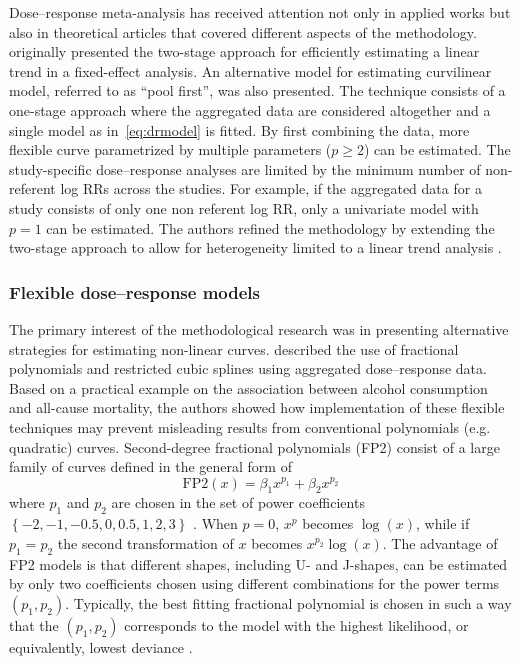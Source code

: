 \documentclass[11pt,a4paper,twoside,openany]{book}\usepackage{knitr}
\begin{document}
{Dose--response meta-analysis has received attention not only in applied works but also in theoretical articles that covered different aspects of the methodology. 
\noindent \cite{greenland1992methods} originally presented the two-stage approach for efficiently estimating a linear trend in a fixed-effect analysis. An alternative model for estimating curvilinear model, referred to as ``pool first'', was also presented. The technique consists of a one-stage approach where the aggregated data are considered altogether and a single model as in~\ref{eq:drmodel} is fitted. By first combining the data, more flexible curve parametrized by multiple parameters ($p \ge 2$) can be estimated. The study-specific dose--response analyses are limited by the minimum number of non-referent log RRs across the studies. For example, if the aggregated data for a study consists of only one non referent log RR, only a univariate model with $p = 1$ can be estimated. The authors refined the methodology by extending the two-stage approach to allow for heterogeneity limited to a linear trend analysis \citep{berlin1993meta}. 

\subsubsection*{Flexible dose--response models}

The primary interest of the methodological research was in presenting alternative strategies for estimating non-linear curves. \cite{bagnardi2004flexible} described the use of fractional polynomials and restricted cubic splines using aggregated dose--response data. Based on a practical example on the association between alcohol consumption and all-cause mortality, the authors showed how implementation of these flexible techniques may prevent misleading results from conventional polynomials (e.g. quadratic) curves. 
Second-degree fractional polynomials (FP2) consist of a large family of curves defined in the general form of
\begin{equation}
\mathrm{FP2}(x) = \beta_1 x^{p_1} + \beta_2x^{p_2}
\label{eq:fracpol}
\end{equation}
\noindent where $p_1$ and $p_2$ are chosen in the set of power coefficients $\left\{-2, -1, -0.5, 0, 0.5, 1, 2, 3 \right\}$ \citep{royston1994regression, royston2000strategy}. When $p = 0$, $x^p$ becomes $\log(x)$, while if $p_1 = p_2$ the second transformation of $x$ becomes $x^{p_2}\log(x)$. The advantage of FP2 models is that different shapes, including U- and J-shapes, can be estimated by only two coefficients chosen using different combinations for the power terms $(p_1, p_2)$. Typically, the best fitting fractional polynomial is chosen in such a way that the $(p_1, p_2)$ corresponds to the model with the highest likelihood, or equivalently, lowest deviance \citep{royston2001flexible}. 

}
\end{document}
